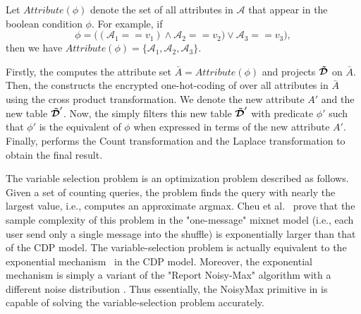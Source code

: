 Let $Attribute(\phi)$ denote the set of all attributes in $\mathcal{A}$ that appear in the boolean condition $\phi$. For example, if $$\phi = \big((\mathcal{A}_1==v_1) \land \mathcal{A}_2==v_2) \vee \mathcal{A}_3==v_3 \big),$$ then we have $Attribute(\phi)=\{\mathcal{A}_1, \mathcal{A}_2,\mathcal{A}_3\}$.

Firstly, the \AS computes the attribute set $\bar{A}=Attribute(\phi)$ and projects $\boldsymbol{\tilde{\mathcal{D}}}$ on $\bar{A}$. Then, the \AS constructs the encrypted one-hot-coding of over all attributes in $\bar{A}$ using the cross product transformation. We denote the new attribute $A'$ and the new table $\boldsymbol{\tilde{\mathcal{D}}}'$. Now, the \AS simply filters this new table $\boldsymbol{\tilde{\mathcal{D}}}'$ with predicate $\phi'$  such that $\phi'$ is the equivalent of $\phi$ when expressed in terms of the new  attribute $A'$. Finally, \AS  performs the \textsf{Count} transformation and the \textsf{Laplace} transformation to obtain the final result.


 The variable selection problem is an optimization problem described as follows. Given a set of counting queries, the problem finds the query with nearly the largest value, i.e., computes an approximate argmax. Cheu et al.~\cite{mixnets} prove that the sample complexity of this problem in the "one-message" mixnet model (i.e., each user send only a single message into the shuffle) is exponentially larger than that of the \textsf{CDP} model. The variable-selection problem is actually equivalent to the exponential mechanism~\cite{Dork} in the \textsf{CDP} model. Moreover, the exponential mechanism is simply a variant of the "Report Noisy-Max" algorithm with a different noise distribution \cite{Nm}.  Thus essentially, the \textsf{NoisyMax} primitive in \system is capable of solving the variable-selection problem accurately.

